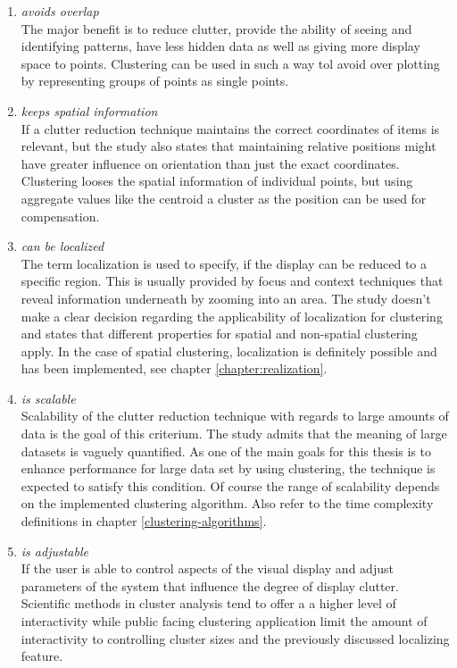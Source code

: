 \begin{enumerate}

\item \textit{avoids overlap}
\\ The major benefit is to reduce clutter, provide the ability of seeing and identifying patterns, have less hidden data as well as giving more display space to points. Clustering can be used in such a way tol avoid over plotting by representing groups of points as single points.

\item \textit{keeps spatial information}
\\ If a clutter reduction technique maintains the correct coordinates of items is relevant, but the study also states that maintaining relative positions might have greater influence on orientation than just the exact coordinates. Clustering looses the spatial information of individual points, but using aggregate values like the centroid a cluster as the position can be used for compensation. 

\item \textit{can be localized}
\\ The term localization is used to specify, if the display can be reduced to a specific region. This is usually provided by focus and context techniques that reveal information underneath by zooming into an area. The study doesn't make a clear decision regarding the applicability of localization for clustering and states that different properties for spatial and non-spatial clustering apply. In the case of spatial clustering, localization is definitely possible and has been implemented, see chapter \ref{chapter:realization}.  

\item \textit{is scalable}
\\ Scalability of the clutter reduction technique with regards to large amounts of data is the goal of this criterium. The study admits that the meaning of large datasets is vaguely quantified. As one of the main goals for this thesis is to enhance performance for large data set by using clustering, the technique is expected to satisfy this condition. Of course the range of scalability depends on the implemented clustering algorithm. Also refer to the time complexity definitions in chapter \ref{clustering-algorithms}. 

\item \textit{is adjustable}
\\ If the user is able to control aspects of the visual display and adjust parameters of the system that influence the degree of display clutter. Scientific methods in cluster analysis tend to offer a a higher level of interactivity while public facing clustering application limit the amount of interactivity to controlling cluster sizes and the previously discussed localizing feature. 


\end{enumerate}
